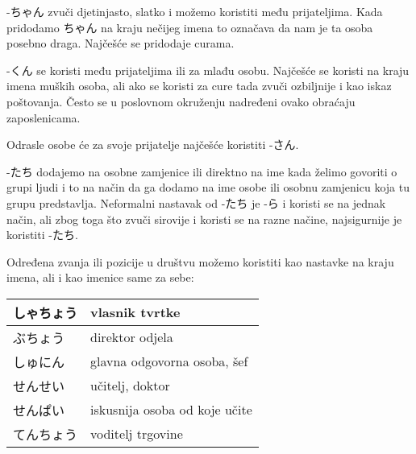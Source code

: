	\vspace{10pt}	
	
	-ちゃん zvuči djetinjasto, slatko i možemo koristiti među prijateljima. Kada pridodamo ちゃん na kraju nečijeg imena to označava da nam je ta osoba posebno draga. Najčešće se pridodaje curama.
	
	\vspace{10pt}	
	
	-くん se koristi među prijateljima ili za mlađu osobu. Najčešće se koristi na kraju imena muških osoba, ali ako se koristi za cure tada zvuči ozbiljnije i kao iskaz poštovanja. Često se u poslovnom okruženju nadređeni ovako obraćaju zaposlenicama.
	
	\vspace{10pt}

Odrasle osobe će za svoje prijatelje najčešće koristiti -さん.

	\vspace{10pt}
	
	-たち dodajemo na osobne zamjenice ili direktno na ime kada želimo govoriti o grupi ljudi i to na način da ga dodamo na ime osobe ili osobnu zamjenicu koja tu grupu predstavlja. Neformalni nastavak od -たち je -ら i koristi se na jednak način, ali zbog toga što zvuči sirovije i koristi se na razne načine, najsigurnije je koristiti -たち.


	\begin{reibun}
	\end{reibun}

	\newpage

	\ten {}
	
	Određena zvanja ili pozicije u društvu možemo koristiti kao nastavke na kraju imena, ali i kao imenice same za sebe:
	
	\vspace{10pt}
	
	\begin{tabular}{|l|l|}
		\hline
		しゃちょう&vlasnik tvrtke\\\hline
		ぶちょう&direktor odjela\\\hline
		しゅにん&glavna odgovorna osoba, šef\\\hline
		せんせい&učitelj, doktor\\\hline
		せんぱい&iskusnija osoba od koje učite\\\hline
		てんちょう&voditelj trgovine\\\hline
	\end{tabular}
	
